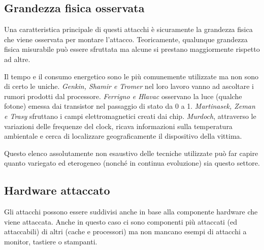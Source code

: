 		\subsection*{Grandezza fisica osservata}		
			Una caratteristica principale di questi attacchi è sicuramente la grandezza fisica che viene osservata per montare l'attacco. Teoricamente, qualunque grandezza fisica misurabile può essere sfruttata ma alcune si prestano maggiormente rispetto ad altre. 
			
			Il tempo e il consumo energetico sono le più comunemente utilizzate ma non sono di certo le uniche. \emph{Genkin, Shamir e Tromer} nel loro lavoro \cite{genkin2014rsa} vanno ad ascoltare i rumori prodotti dal processore. \emph{Ferrigno e Hlavac}\cite{ferrigno2008aes} osservano la luce (qualche fotone) emessa dai transistor nel passaggio di stato da 0 a 1. \emph{Martinasek, Zeman e Trasy}\cite{martinasek2012simple} sfruttano i campi elettromagnetici creati dai chip. \emph{Murdoch}, attraverso le variazioni delle frequenze del clock, ricava informazioni sulla temperatura ambientale e cerca di localizzare geograficamente il dispositivo della vittima.
			
			Questo elenco assolutamente non esaustivo delle tecniche utilizzate può far capire quanto variegato ed eterogeneo (nonché in continua evoluzione) sia questo settore.
			
		\subsection*{Hardware attaccato}		
			Gli attacchi possono essere suddivisi anche in base alla componente hardware che viene attaccata. Anche in questo caso ci sono componenti più attaccati (ed attaccabili) di altri (cache e processori) ma non mancano esempi di attacchi a monitor\cite{van1985electromagn}, tastiere\cite{asonov2004keyboard} o stampanti\cite{backes2010acoustic}.
			
